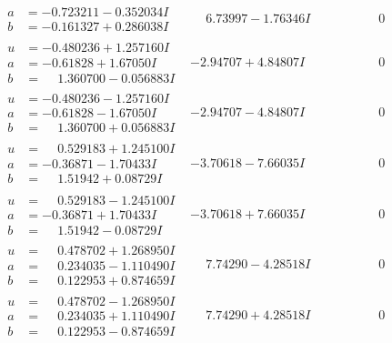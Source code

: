 \documentclass[1p]{elsarticle_modified}
\theoremstyle{definition}
\begin{document}
$$\begin{array}{c|c|c}
\begin{aligned}
a &= -0.723211 - 0.352034 I \\
b &= -0.161327 + 0.286038 I\end{aligned}
 & \phantom{-}6.73997 - 1.76346 I & \phantom{-0.000000 } 0 \\ \hline\begin{aligned}
u &= -0.480236 + 1.257160 I \\
a &= -0.61828 + 1.67050 I \\
b &= \phantom{-}1.360700 - 0.056883 I\end{aligned}
 & -2.94707 + 4.84807 I & \phantom{-0.000000 } 0 \\ \hline\begin{aligned}
u &= -0.480236 - 1.257160 I \\
a &= -0.61828 - 1.67050 I \\
b &= \phantom{-}1.360700 + 0.056883 I\end{aligned}
 & -2.94707 - 4.84807 I & \phantom{-0.000000 } 0 \\ \hline\begin{aligned}
u &= \phantom{-}0.529183 + 1.245100 I \\
a &= -0.36871 - 1.70433 I \\
b &= \phantom{-}1.51942 + 0.08729 I\end{aligned}
 & -3.70618 - 7.66035 I & \phantom{-0.000000 } 0 \\ \hline\begin{aligned}
u &= \phantom{-}0.529183 - 1.245100 I \\
a &= -0.36871 + 1.70433 I \\
b &= \phantom{-}1.51942 - 0.08729 I\end{aligned}
 & -3.70618 + 7.66035 I & \phantom{-0.000000 } 0 \\ \hline\begin{aligned}
u &= \phantom{-}0.478702 + 1.268950 I \\
a &= \phantom{-}0.234035 - 1.110490 I \\
b &= \phantom{-}0.122953 + 0.874659 I\end{aligned}
 & \phantom{-}7.74290 - 4.28518 I & \phantom{-0.000000 } 0 \\ \hline\begin{aligned}
u &= \phantom{-}0.478702 - 1.268950 I \\
a &= \phantom{-}0.234035 + 1.110490 I \\
b &= \phantom{-}0.122953 - 0.874659 I\end{aligned}
 & \phantom{-}7.74290 + 4.28518 I & \phantom{-0.000000 } 0 \\ \hline\begin{aligned}

\end{aligned}
\end{array}$$
\end{document}
